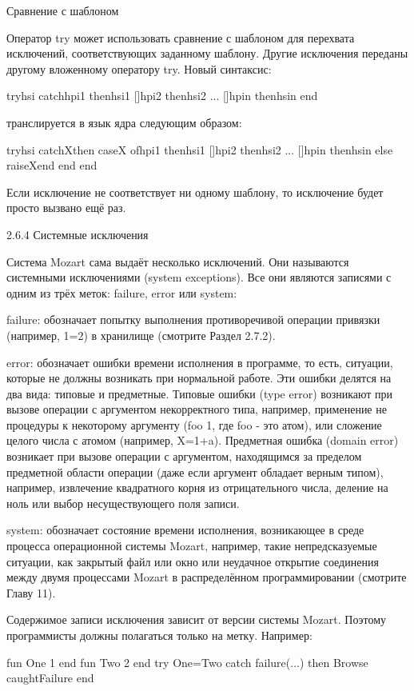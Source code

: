Сравнение с шаблоном

Оператор try может использовать сравнение с шаблоном для перехвата исключений, соответствующих заданному шаблону. Другие исключения переданы другому вложенному оператору try. Новый синтаксис:

tryhsi
catchhpi1 thenhsi1
[]hpi2 thenhsi2
...
[]hpin thenhsin
end

транслируется в язык ядра следующим образом:

tryhsi
catchXthen
caseX
ofhpi1 thenhsi1
[]hpi2 thenhsi2
...
[]hpin thenhsin
else raiseXend
end
end

Если исключение не соответствует ни одному шаблону, то исключение будет просто вызвано ещё раз.

2.6.4 Системные исключения

Система Mozart сама выдаёт несколько исключений. Они называются системными исключениями (system exceptions). Все они являются записями с одним из трёх меток: failure, error или system:

failure: обозначает попытку выполнения противоречивой операции привязки (например, 1=2) в хранилище (смотрите Раздел 2.7.2).

error: обозначает ошибки времени исполнения в программе, то есть, ситуации, которые не должны возникать при нормальной работе. Эти ошибки делятся на два вида: типовые и предметные. Типовые ошибки (type error) возникают при вызове операции с аргументом некорректного типа, например, применение не процедуры к некоторому аргументу ({foo 1}, где foo - это атом), или сложение целого числа с атомом (например, X=1+a). Предметная ошибка (domain error) возникает при вызове операции с аргументом, находящимся за пределом предметной области операции (даже если аргумент обладает верным типом), например, извлечение квадратного корня из отрицательного числа, деление на ноль или выбор несуществующего поля записи.

system: обозначает состояние времени исполнения, возникающее в среде процесса операционной системы Mozart, например, такие непредсказуемые ситуации, как закрытый файл или окно или неудачное открытие соединения между двумя процессами Mozart в распределённом программировании (смотрите Главу 11).

Содержимое записи исключения зависит от версии системы Mozart. Поэтому программисты должны полагаться только на метку. Например:

fun {One} 1 end
fun {Two} 2 end
try {One}={Two}
catch
failure(...) then {Browse caughtFailure}
end


